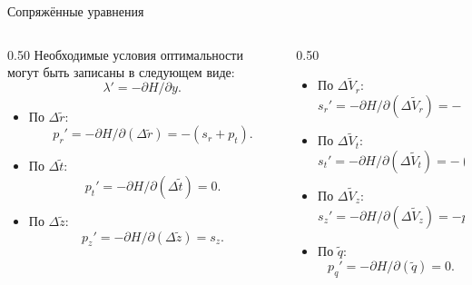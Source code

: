 \documentclass[9pt]{beamer}
\begin{document}
\begin{frame}{Сопряжённые уравнения}
\begin{columns}[T,onlytextwidth]
  \begin{column}{0.50\textwidth}
  Необходимые условия оптимальности могут быть записаны в следующем виде:
  \begin{equation*}
      \lambda' = -\partial H / \partial y.
  \end{equation*}
  \begin{itemize}
      \item По $\Delta \tilde r$:
      \begin{equation*}
          p_r' = - \partial H / \partial (\Delta \tilde r) = -(s_r + p_t).
      \end{equation*}
      \item По $\Delta \tilde t$:
      \begin{equation*}
          p_t' = - \partial H / \partial (\Delta \tilde t) = 0.
      \end{equation*}
      \item По $\Delta \tilde z$:
      \begin{equation*}
          p_z' = - \partial H / \partial (\Delta \tilde z) = s_z.
      \end{equation*}
  \end{itemize}
  \end{column}

  \begin{column}{0.50\textwidth}
    \begin{itemize}
        \item По $\Delta \tilde V_r$:
          \begin{equation*}
              s_r' = - \partial H / \partial (\Delta \tilde V_r) = -(p_r - s_t) = s_t - p_r.
          \end{equation*}
        \item По $\Delta \tilde V_t$:
          \begin{equation*}
              s_t' = - \partial H / \partial (\Delta \tilde V_t) = -( 2s_r - p_t) = p_t - 2s_r.
          \end{equation*}  
        \item По $\Delta \tilde V_z$:
          \begin{equation*}
              s_z' = - \partial H / \partial (\Delta \tilde V_z) = -p_z.
          \end{equation*}   
          \item По $\tilde q$:
          \begin{equation*}
              p_q' = - \partial H / \partial (\tilde q) = 0.
          \end{equation*}
    \end{itemize}
  \end{column}
\end{columns}
\end{frame}
\end{document}
